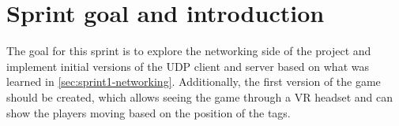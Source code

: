 \section{Sprint goal and introduction}\label{sec:sprint1-goals}
The goal for this sprint is to explore the networking side of the project and implement initial versions of the UDP client and server based on what was learned in \autoref{sec:sprint1-networking}.
Additionally, the first version of the game should be created, which allows seeing the game through a VR headset and can show the players moving based on the position of the tags.

